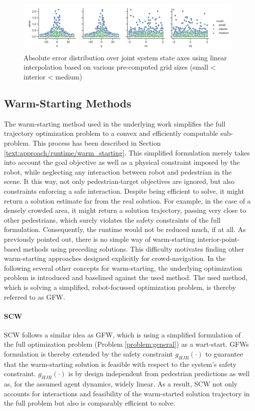 \begin{figure}[!ht]
\begin{center}
\includegraphics[width=\imgwidth]{images/hj_hist_linear.png}
\caption{Absolute error distribution over joint system state axes using linear interpolation based on various pre-computed grid sizes (small < interior < medium)}
\label{img:hj_approx_hist}
\end{center}
\end{figure}

\subsection{Warm-Starting Methods}
The warm-starting method used in the underlying work simplifies the full trajectory optimization problem to a convex and efficiently computable sub-problem. This process has been described in Section \ref{text:approach/runtime/warm_starting}. This simplified formulation merely takes into account the goal objective as well as a physical constraint imposed by the robot, while neglecting any interaction between robot and pedestrian in the scene. It this way, not only pedestrian-target objectives are ignored, but also constraints enforcing a safe interaction. Despite being efficient to solve, it might return a solution estimate far from the real solution. For example, in the case of a densely crowded area, it might return a solution trajectory, passing very close to other pedestrians, which surely violates the safety constraints of the full formulation. Consequently, the runtime would not be reduced much, if at all. 
\newline
As previously pointed out, there is no simple way of warm-starting interior-point-based methods using preceding solutions. This difficulty motivates finding other warm-starting approaches designed explicitly for crowd-navigation. In the following several other concepts for warm-starting, the underlying optimization problem is introduced and baselined against the used method. The used method, which is solving a simplified, robot-focussed optimization problem, is thereby referred to as \ac{GFW}.
\paragraph{
\ac{SCW}} 
SCW follows a similar idea as \ac{GFW}, which is using a simplified formulation of the full optimization problem (Problem \ref{problem:general}) as a wart-start. \ac{GFW}s formulation is thereby extended by the safety constraint $g_{HJR}(\cdot)$ to guarantee that the warm-starting solution is feasible with respect to the system's safety constraint. $g_{HJR}(\cdot)$ is by design independent from pedestrian predictions as well as, for the assumed agent dynamics, widely linear. As a result, \ac{SCW} not only accounts for interactions and feasibility of the warm-started solution trajectory in the full problem but also is comparably efficient to solve.

